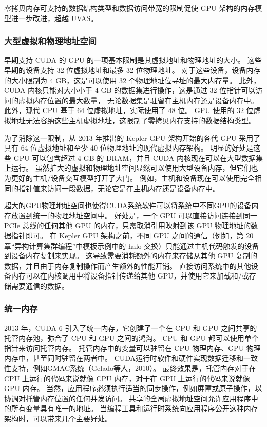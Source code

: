 零拷贝内存可支持的数据结构类型和数据访问带宽的限制促使 GPU 架构的内存模型进一步改进，超越 UVAS。

\subsubsection{大型虚拟和物理地址空间}
早期支持 CUDA 的 GPU 的一项基本限制是其虚拟地址和物理地址的大小。 这些早期的设备支持 32 位虚拟地址和最多 32 位物理地址。 
对于这些设备，设备内存的大小限制为 4 GB，这是可以使用 32 个物理地址位寻址的最大内存量。 
此外，CUDA 内核只能对大小小于 4 GB 的数据集进行操作，这是通过 32 位指针可以访问的虚拟内存位置的最大数量，
无论数据集是驻留在主机内存还是设备内存中。 此外，现代 CPU 基于 64 位虚拟地址，实际使用了 48 位。 
GPU 使用的 32 位虚拟地址无法容纳这些主机虚拟地址，这限制了零拷贝内存支持的数据结构类型。

为了消除这一限制，从 2013 年推出的 Kepler GPU 架构开始的各代 GPU 采用了具有 64 位虚拟地址和至少 40 位物理地址的现代虚拟内存架构。 
明显的好处是这些 GPU 可以包含超过 4 GB 的 DRAM，并且 CUDA 内核现在可以在大型数据集上运行。 
虽然扩大的虚拟和物理地址空间显然可以使用大型设备内存，但它们也为更好的主机/设备交互模型打开了大门。 
例如，主机和设备现在可以使用完全相同的指针值来访问一段数据，无论它是在主机内存还是设备内存中。

超大的GPU物理地址空间也使得CUDA系统软件可以将系统中不同GPU的设备内存放置到统一的物理地址空间中。 
好处是，一个 GPU 可以直接访问连接到同一 PCIe 总线的任何其他 GPU 的内存，只需取消引用映射到该 GPU 物理地址的数据指针即可。 
在 Kepler GPU 架构之前，不同 GPU 之间的通信（例如，第 20 章“异构计算集群编程”中模板示例中的 halo 交换）只能通过主机代码触发的设备到设备内存复制来实现。 
这导致需要消耗额外的内存来存储从其他 GPU 复制的数据，并且由于内存复制操作而产生额外的性能开销。 
直接访问系统中的其他设备内存可以在内核调用中将设备指针传递给其他 GPU，并使用它来加载和/或存储需要通信的数据。

\subsubsection{统一内存}
2013 年，CUDA 6 引入了统一内存，它创建了一个在 CPU 和 GPU 之间共享的托管内存池，弥合了 CPU 和 GPU 之间的鸿沟。 
CPU 和 GPU 都可以使用单个指针来访问托管内存。 
托管内存中的变量可以驻留在 CPU 物理内存、GPU 物理内存中，甚至同时驻留在两者中。 
CUDA运行时软件和硬件实现数据迁移和一致性支持，例如GMAC系统（Gelado等人，2010）。 
最终效果是，托管内存对于在 CPU 上运行的代码来说就像 CPU 内存，对于在 GPU 上运行的代码来说就像 GPU 内存。 
当然，应用程序必须执行适当的同步操作，例如屏障或原子操作，以协调对托管内存位置的任何并发访问。 
共享的全局虚拟地址空间允许应用程序中的所有变量具有唯一的地址。 
当编程工具和运行时系统向应用程序公开这种内存架构时，可以带来几个主要好处。


